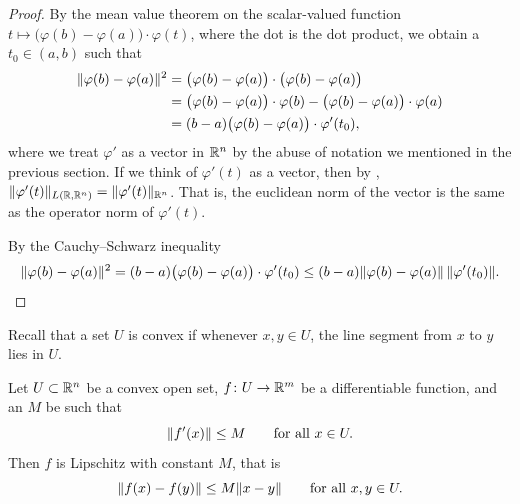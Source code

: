 \begin{proof}
By the mean value theorem on the scalar-valued function
$t \mapsto \bigl(\varphi(b)-\varphi(a) \bigr) \cdot \varphi(t)$,
where the dot is the dot product, we obtain
a $t_0 \in (a,b)$ such that
\begin{equation*}
\begin{split}
\lVert {\varphi(b)-\varphi(a)} \rVert^2
& =
\bigl( \varphi(b)-\varphi(a) \bigr)
\cdot
\bigl( \varphi(b)-\varphi(a) \bigr)
\\
& =
\bigl(\varphi(b)-\varphi(a) \bigr) \cdot \varphi(b) - 
\bigl(\varphi(b)-\varphi(a) \bigr) \cdot \varphi(a)
\\
& = 
(b-a)
\bigl(\varphi(b)-\varphi(a) \bigr) \cdot \varphi'(t_0) ,
\end{split}
\end{equation*}
where we treat $\varphi'$ as a vector in ${\mathbb{R}}^n$ by the abuse of
notation we mentioned in the previous section.
If we think of $\varphi'(t)$ as a vector, then by
,
$\lVert {\varphi'(t)} \rVert_{L({\mathbb{R}},{\mathbb{R}}^n)} = \lVert {\varphi'(t)} \rVert_{{\mathbb{R}}^n}$.
That is, the euclidean norm of the vector is the same as the operator norm
of $\varphi'(t)$.

By the Cauchy--Schwarz inequality
\begin{equation*}
\lVert {\varphi(b)-\varphi(a)} \rVert^2
=
(b-a)\bigl(\varphi(b)-\varphi(a) \bigr) \cdot \varphi'(t_0)
\leq
(b-a)
\lVert {\varphi(b)-\varphi(a)} \rVert \, \lVert {\varphi'(t_0)} \rVert . \qedhere
\end{equation*}
\end{proof}

Recall that a set $U$ is convex
if whenever $x,y \in U$, the line segment from
$x$ to $y$ lies in $U$.

\begin{prop} \label{mv:prop:convexlip}
Let $U \subset {\mathbb{R}}^n$ be a convex open set, $f \colon U \to {\mathbb{R}}^m$
be a differentiable function, and an $M$ be such that
\begin{equation*}
\lVert {f'(x)} \rVert \leq M
\qquad \text{for all } x \in U.
\end{equation*}
Then $f$ is Lipschitz with constant $M$, that is
\begin{equation*}
\lVert {f(x)-f(y)} \rVert \leq M \lVert {x-y} \rVert
\qquad
\text{for all } x,y \in U.
\end{equation*}
\end{prop}

